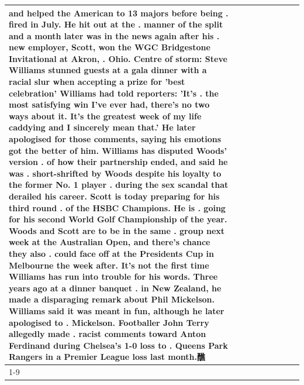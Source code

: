 \begin{table}[H]
\begin{tabular}{lllrlllll}
and helped the American to 13 majors before being . fired in July. He hit out at the . manner of the split and a month later was in the news again after his . new employer, Scott, won the WGC Bridgestone Invitational at Akron, . Ohio. Centre of storm: Steve Williams stunned guests at a gala dinner with a racial slur when accepting a prize for 'best celebration' Williams had told reporters: 'It's . the most satisfying win I've ever had, there's no two ways about it. It's the greatest week of my life caddying and I sincerely mean that.' He later apologised for those comments, saying his emotions got the better of him. Williams has disputed Woods' version . of how their partnership ended, and said he was . short-shrifted by Woods despite his loyalty to the former No. 1 player . during the sex scandal that derailed his career. Scott is today preparing for his third round . of the HSBC Champions. He is . going for his second World Golf Championship of the year. Woods and Scott are to be in the same . group next week at the Australian Open, and there's chance they also . could face off at the Presidents Cup in Melbourne the week after. It's not the first time Williams has run into trouble for his words. Three years ago at a dinner banquet . in New Zealand, he made a disparaging remark about Phil Mickelson. Williams said it was meant in fun, although he later apologised to . Mickelson. Footballer John Terry allegedly made . racist comments toward Anton Ferdinand during Chelsea's 1-0 loss to . Queens Park Rangers in a Premier League loss last month.醮 \\
\cline{1-9}

\end{tabular}
\end{table}
